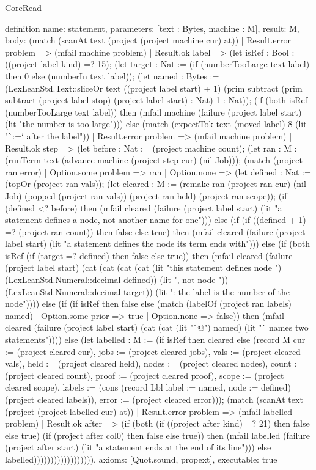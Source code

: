 \begin{lexlean}{CoreRead}
\begin{semanticmodule}
definition{
  name: statement,
  parameters: [text : Bytes, machine : M],
  result: M,
  body: (match (scanAt text (project (project machine cur) at))
    | Result.error problem => (mfail machine problem)
    | Result.ok label => (let isRef : Bool := ((project label kind) =? 15); (let target : Nat := (if (numberTooLarge text label) then 0 else (numberIn text label)); (let named : Bytes := (LexLeanStd.Text::sliceOr text ((project label start) + 1) (prim subtract (prim subtract (project label stop) (project label start) : Nat) 1 : Nat)); (if (both isRef (numberTooLarge text label)) then (mfail machine (failure (project label start) (lit "the number is too large"))) else (match (expectTok text (moved label) 8 (lit "`:=` after the label"))
      | Result.error problem => (mfail machine problem)
      | Result.ok step => (let before : Nat := (project machine count); (let ran : M := (runTerm text (advance machine (project step cur) (nil Job))); (match (project ran error)
        | Option.some problem => ran
        | Option.none => (let defined : Nat := (topOr (project ran vals)); (let cleared : M := (remake ran (project ran cur) (nil Job) (popped (project ran vals)) (project ran held) (project ran scope)); (if (defined <? before) then (mfail cleared (failure (project label start) (lit "a statement defines a node, not another name for one"))) else (if (if ((defined + 1) =? (project ran count)) then false else true) then (mfail cleared (failure (project label start) (lit "a statement defines the node its term ends with"))) else (if (both isRef (if (target =? defined) then false else true)) then (mfail cleared (failure (project label start) (cat (cat (cat (cat (lit "this statement defines node ") (LexLeanStd.Numeral::decimal defined)) (lit ", not node ")) (LexLeanStd.Numeral::decimal target)) (lit ": the label is the number of the node")))) else (if (if isRef then false else (match (labelOf (project ran labels) named)
          | Option.some prior => true
          | Option.none => false)) then (mfail cleared (failure (project label start) (cat (cat (lit "`@") named) (lit "` names two statements")))) else (let labelled : M := (if isRef then cleared else (record M {cur := (project cleared cur), jobs := (project cleared jobs), vals := (project cleared vals), held := (project cleared held), nodes := (project cleared nodes), count := (project cleared count), proof := (project cleared proof), scope := (project cleared scope), labels := (cons (record Lbl {label := named, node := defined}) (project cleared labels)), error := (project cleared error)})); (match (scanAt text (project (project labelled cur) at))
          | Result.error problem => (mfail labelled problem)
          | Result.ok after => (if (both (if ((project after kind) =? 21) then false else true) (if (project after col0) then false else true)) then (mfail labelled (failure (project after start) (lit "a statement ends at the end of its line"))) else labelled)))))))))))))))))),
  axioms: [Quot.sound, propext],
  executable: true
}


\end{semanticmodule}
\end{lexlean}
